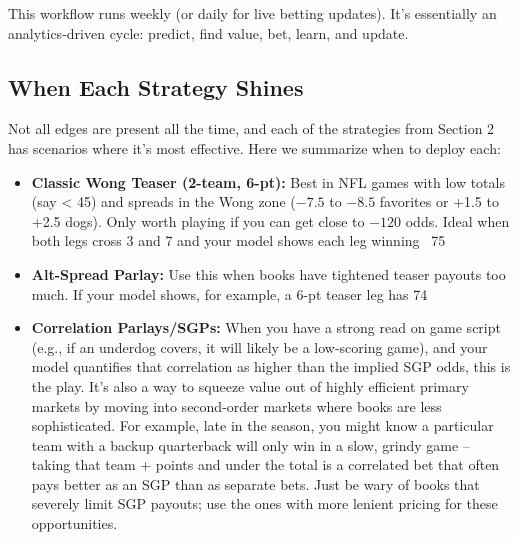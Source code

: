 \documentclass[11pt]{amsart}
\begin{document}
This workflow runs weekly (or daily for live betting updates). It’s essentially an analytics-driven cycle: predict, find value, bet, learn, and update.

\subsection{When Each Strategy Shines}
Not all edges are present all the time, and each of the strategies from Section 2 has scenarios where it’s most effective. Here we summarize when to deploy each:
\begin{itemize}
    \item \textbf{Classic Wong Teaser (2-team, 6-pt):} Best in NFL games with low totals (say < 45) and spreads in the Wong zone (\(-7.5\) to \(-8.5\) favorites or +1.5 to +2.5 dogs). Only worth playing if you can get close to \(-120\) odds. Ideal when both legs cross 3 and 7 and your model shows each leg winning ~75%
    \item \textbf{Alt-Spread Parlay:} Use this when books have tightened teaser payouts too much. If your model shows, for example, a 6-pt teaser leg has 74%
    \item \textbf{Correlation Parlays/SGPs:} When you have a strong read on game script (e.g., if an underdog covers, it will likely be a low-scoring game), and your model quantifies that correlation as higher than the implied SGP odds, this is the play. It’s also a way to squeeze value out of highly efficient primary markets by moving into second-order markets where books are less sophisticated. For example, late in the season, you might know a particular team with a backup quarterback will only win in a slow, grindy game – taking that team + points and under the total is a correlated bet that often pays better as an SGP than as separate bets. Just be wary of books that severely limit SGP payouts; use the ones with more lenient pricing for these opportunities.

\end{itemize}
\end{document}
